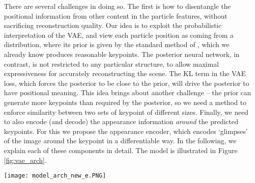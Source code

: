 \documentclass[nohyperref]{article}
\theoremstyle{plain}
\theoremstyle{definition}
\theoremstyle{remark}
\begin{document}
There are several challenges in doing so. 
The first is how to disentangle the positional information from other content in the particle features, without sacrificing reconstruction quality. Our idea is to exploit the probabilistic interpretation of the VAE, and view each particle position as coming from a distribution, where its prior is given by the standard method of \citet{jakab2018unsupervised}, which we already know produces reasonable keypoints. The posterior neural network, in contrast, is not restricted to any particular structure, to allow maximal expressiveness for accurately reconstructing the scene. The KL term in the VAE loss, which forces the posterior to be close to the prior, will drive the posterior to have positional meaning. This idea brings about another challenge -- the prior can generate more keypoints than required by the posterior, so we need a method to enforce similarity between two sets of keypoint of different sizes. Finally, we need to also encode (and decode) the appearance information \textit{around} the predicted keypoints. For this we propose the appearance encoder, which encodes `glimpses' of the image around the keypoint in a differentiable way. In the following, we explain each of these components in detail. The model is illustrated in Figure \ref{fig:vae_arch}.


\begin{center}
\begin{figure*}
\centering
    \texttt{[image: model\_arch\_new\_e.PNG]}
    \vspace{-1.0em}
\caption{DLP architecture. Image is processed by the position encoder to produce the posterior probability of latent particle positions. These positions are used to extract glimpses from the original images using a STN, which are then processed by an appearance encoder to produce the appearance features for each particle. The input image (or an augmented view of it) is also processed by the prior network, producing keypoint proposals via SSM. To reconstruct the image, the particles are (1) transformed to differentiable Gaussian heatmaps and (2) go through a PointNet++ to produce feature maps $\Phi_{graph}$. For the \texttt{Masked} model, the heatmaps are used as binary masks to combine local regions from $\Phi_{graph}$ with bypass features from the encoder. 
For the \texttt{Object} model, a separate glimpse decoder is used to decode RGBA patches, which are then combined with feature maps $\Phi_{graph}$ to produce the output image. See text for full details.}
\label{fig:vae_arch}
    \vspace{-1em}
\end{figure*}
\end{center}
\end{document}
